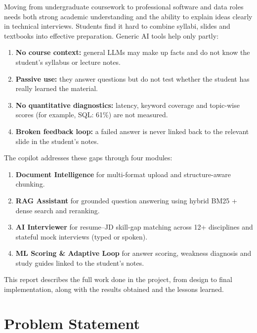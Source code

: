 \documentclass[11pt,a4paper]{report}
\begin{document}
Moving from undergraduate coursework to professional software and data roles needs both strong academic understanding and the ability to explain ideas clearly in technical interviews. Students find it hard to combine syllabi, slides and textbooks into effective preparation. Generic AI tools help only partly:

\begin{enumerate}
  \item \textbf{No course context:} general LLMs may make up facts and do not know the student's syllabus or lecture notes.
  \item \textbf{Passive use:} they answer questions but do not test whether the student has really learned the material.
  \item \textbf{No quantitative diagnostics:} latency, keyword coverage and topic-wise scores (for example, SQL: 61\%) are not measured.
  \item \textbf{Broken feedback loop:} a failed answer is never linked back to the relevant slide in the student's notes.
\end{enumerate}

The copilot addresses these gaps through four modules:

\begin{enumerate}
  \item \textbf{Document Intelligence} for multi-format upload and structure-aware chunking.
  \item \textbf{RAG Assistant} for grounded question answering using hybrid BM25 + dense search and reranking.
  \item \textbf{AI Interviewer} for resume--JD skill-gap matching across 12+ disciplines and stateful mock interviews (typed or spoken).
  \item \textbf{ML Scoring \& Adaptive Loop} for answer scoring, weakness diagnosis and study guides linked to the student's notes.
\end{enumerate}

This report describes the full work done in the project, from design to final implementation, along with the results obtained and the lessons learned.

\chapter{Problem Statement}
\end{document}
